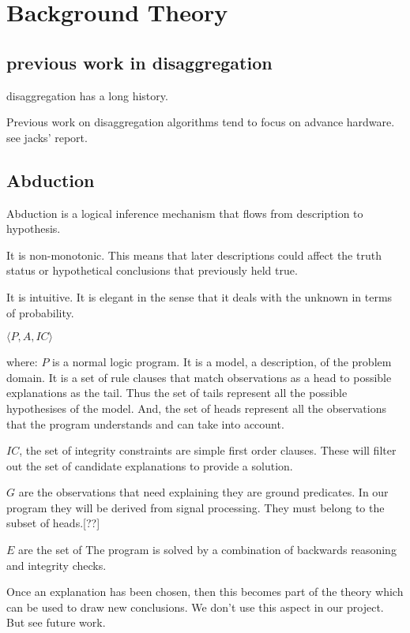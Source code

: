 
\chapter{Background Theory}



\label{ch:background}

\section{previous work in disaggregation}

disaggregation has a long history.

Previous work on disaggregation algorithms tend to focus on advance hardware. see jacks' report.

\section{Abduction}

Abduction is a logical inference mechanism that flows from description to hypothesis.

It is non-monotonic. This means that later descriptions could affect the truth status or hypothetical conclusions that previously held true.

It is intuitive.
It is elegant in the sense that it deals with the unknown in terms of probability.

$ \langle P,A,IC \rangle $

where:
$P$ is a normal logic program. It is a model, a description, of the problem domain. It is a set of rule clauses that match observations as a head to possible explanations as the tail.
Thus the set of tails represent all the possible hypothesises of the model. And, the set of heads represent all the observations that the program understands and can take into account.

$IC$, the set of integrity constraints are simple first order clauses. These will filter out the set of candidate explanations to provide a solution.

$G$ are the observations that need explaining they are ground predicates. In our program they will be derived from signal processing. They must belong to the subset of heads.[??]

$E$ are the set of
The program is solved by a combination of backwards reasoning and integrity checks.

Once an explanation has been chosen, then this becomes part of the theory which can be used to draw new conclusions. We don't use this aspect in our project. But see future work.


